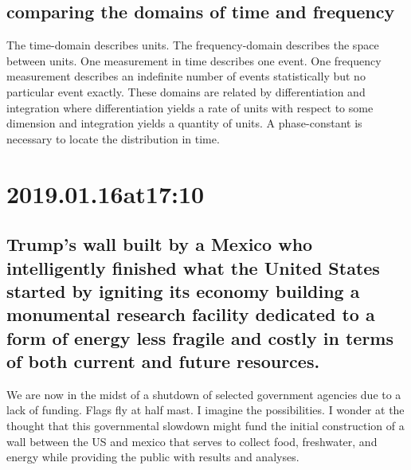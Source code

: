 \subsection*{ comparing the domains of time and frequency }
The time-domain describes units. The frequency-domain describes the space between units. One measurement in time describes one event. One frequency measurement describes an indefinite number of events statistically but no particular event exactly. These domains are related by differentiation and integration where differentiation yields a rate of units with respect to some dimension and integration yields a quantity of units. A phase-constant is necessary to locate the distribution in time.

\section*{ 2019.01.16at17:10 }
\subsection*{ Trump's wall built by a Mexico who intelligently finished what the United States started by igniting its economy building a monumental research facility dedicated to a form of energy less fragile and costly in terms of both current and future resources. }
We are now in the midst of a shutdown of selected government agencies due to a lack of funding. Flags fly at half mast. I imagine the possibilities. I wonder at the thought that this governmental slowdown might fund the initial construction of a wall between the US and mexico that serves to collect food, freshwater, and energy while providing the public with results and analyses.
